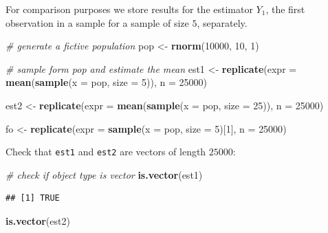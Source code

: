 \documentclass[]{book}
\newenvironment{Shaded}{\begin{snugshade}}{\end{snugshade}}
\newcommand{\KeywordTok}[1]{\textcolor[rgb]{0.13,0.29,0.53}{\textbf{#1}}}
\newcommand{\DataTypeTok}[1]{\textcolor[rgb]{0.13,0.29,0.53}{#1}}
\newcommand{\DecValTok}[1]{\textcolor[rgb]{0.00,0.00,0.81}{#1}}
\newcommand{\StringTok}[1]{\textcolor[rgb]{0.31,0.60,0.02}{#1}}
\newcommand{\CommentTok}[1]{\textcolor[rgb]{0.56,0.35,0.01}{\textit{#1}}}
\newcommand{\NormalTok}[1]{#1}
\theoremstyle{definition}
\theoremstyle{definition}
\theoremstyle{definition}
\theoremstyle{remark}
\begin{document}
For comparison purposes we store results for the estimator \(Y_1\), the
first observation in a sample for a sample of size \(5\), separately.

\begin{Shaded}
\begin{Highlighting}[]
\CommentTok{# generate a fictive population}
\NormalTok{pop <-}\StringTok{ }\KeywordTok{rnorm}\NormalTok{(}\DecValTok{10000}\NormalTok{, }\DecValTok{10}\NormalTok{, }\DecValTok{1}\NormalTok{)}

\CommentTok{# sample form pop and estimate the mean}
\NormalTok{est1 <-}\StringTok{ }\KeywordTok{replicate}\NormalTok{(}\DataTypeTok{expr =} \KeywordTok{mean}\NormalTok{(}\KeywordTok{sample}\NormalTok{(}\DataTypeTok{x =}\NormalTok{ pop, }\DataTypeTok{size =} \DecValTok{5}\NormalTok{)), }\DataTypeTok{n =} \DecValTok{25000}\NormalTok{)}

\NormalTok{est2 <-}\StringTok{ }\KeywordTok{replicate}\NormalTok{(}\DataTypeTok{expr =} \KeywordTok{mean}\NormalTok{(}\KeywordTok{sample}\NormalTok{(}\DataTypeTok{x =}\NormalTok{ pop, }\DataTypeTok{size =} \DecValTok{25}\NormalTok{)), }\DataTypeTok{n =} \DecValTok{25000}\NormalTok{)}

\NormalTok{fo <-}\StringTok{ }\KeywordTok{replicate}\NormalTok{(}\DataTypeTok{expr =} \KeywordTok{sample}\NormalTok{(}\DataTypeTok{x =}\NormalTok{ pop, }\DataTypeTok{size =} \DecValTok{5}\NormalTok{)[}\DecValTok{1}\NormalTok{], }\DataTypeTok{n =} \DecValTok{25000}\NormalTok{)}
\end{Highlighting}
\end{Shaded}

Check that \texttt{est1} and \texttt{est2} are vectors of length
\(25000\):

\begin{Shaded}
\begin{Highlighting}[]
\CommentTok{# check if object type is vector}
\KeywordTok{is.vector}\NormalTok{(est1)}
\end{Highlighting}
\end{Shaded}

\begin{verbatim}
## [1] TRUE
\end{verbatim}

\begin{Shaded}
\begin{Highlighting}[]
\KeywordTok{is.vector}\NormalTok{(est2)}
\end{Highlighting}
\end{Shaded}
\end{document}
